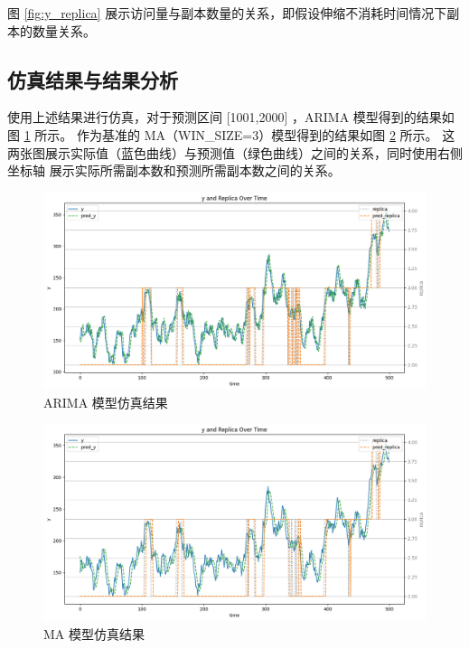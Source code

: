\documentclass[a4paper,AutoFakeBold,oneside,12pt]{book}
\begin{document}
图 \ref{fig:y_replica} 展示访问量与副本数量的关系，即假设伸缩不消耗时间情况下副本的数量关系。

\subsection{仿真结果与结果分析}

使用上述结果进行仿真，对于预测区间 [1001,2000] ，ARIMA 模型得到的结果如图 \ref{fig:arima_simulation} 所示。
作为基准的 MA（WIN\_SIZE=3）模型得到的结果如图 \ref{fig:ma_simulation} 所示。
这两张图展示实际值（蓝色曲线）与预测值（绿色曲线）之间的关系，同时使用右侧坐标轴
展示实际所需副本数和预测所需副本数之间的关系。

\begin{figure}[htbp]
	\centering
	\includegraphics[width=1.0\textwidth]{images/arima_simulation.png}
	\caption{ARIMA 模型仿真结果}
	\label{fig:arima_simulation}
  \end{figure}

  \begin{figure}[htbp]
	\centering
	\includegraphics[width=1.0\textwidth]{images/ma_simulation.png}
	\caption{MA 模型仿真结果}
	\label{fig:ma_simulation}
  \end{figure}
\end{document}
